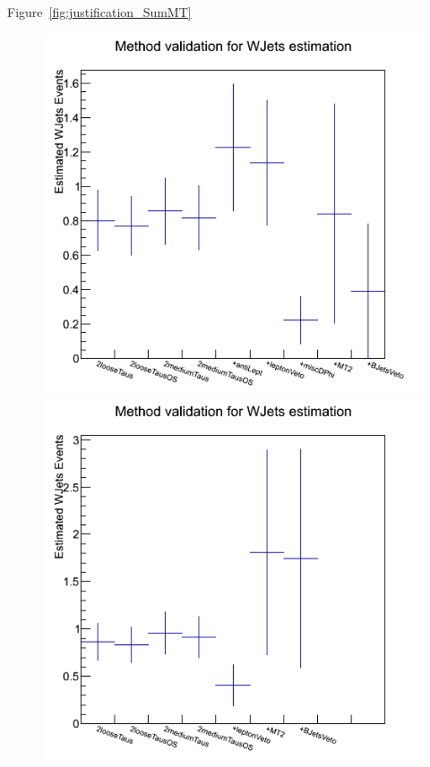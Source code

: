 Figure~\ref{fig:justification_SumMT}  
\begin{figure}[htbp]
\centering
\includegraphics[angle=0,scale=0.35]{TauTauFigs/WJetsEst_bin2.png}
\includegraphics[angle=0,scale=0.35]{TauTauFigs/WJetsEst_bin2_miscApplied.png} \\

\end{figure}
